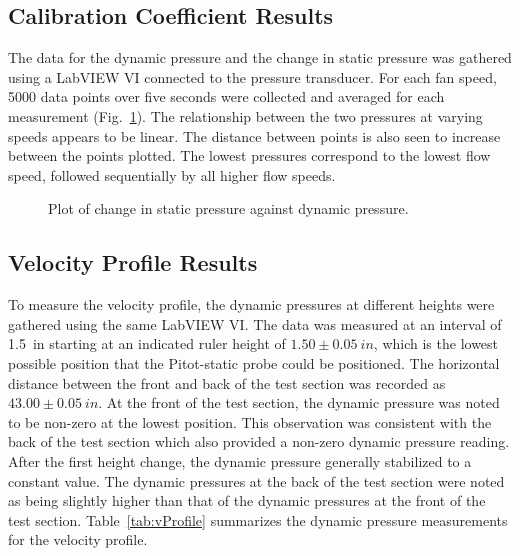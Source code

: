 \documentclass[journal,letterpaper]{IEEEtran}
\begin{document}
\subsection{Calibration Coefficient Results}

The data for the dynamic pressure and the change in static pressure was gathered using a LabVIEW VI connected to the pressure transducer.
For each fan speed, 5000 data points over five seconds were collected and averaged for each measurement (Fig.~\ref{fig:data}).
The relationship between the two pressures at varying speeds appears to be linear.
The distance between points is also seen to increase between the points plotted.
The lowest pressures correspond to the lowest flow speed, followed sequentially by all higher flow speeds.

\begin{figure}[H]
    \centering
    
    \caption{Plot of change in static pressure against dynamic pressure.}
    \label{fig:data}
\end{figure}

\subsection{Velocity Profile Results}

To measure the velocity profile, the dynamic pressures at different heights were gathered using the same LabVIEW VI.
The data was measured at an interval of \qty{1.5}{in} starting at an indicated ruler height of $1.50 \pm \qty{0.05}{in}$, which is the lowest possible position that the Pitot-static probe could be positioned.
The horizontal distance between the front and back of the test section was recorded as $43.00 \pm \qty{0.05}{in}$.
At the front of the test section, the dynamic pressure was noted to be non-zero at the lowest position.
This observation was consistent with the back of the test section which also provided a non-zero dynamic pressure reading.
After the first height change, the dynamic pressure generally stabilized to a constant value.
The dynamic pressures at the back of the test section were noted as being slightly higher than that of the dynamic pressures at the front of the test section. Table~\ref{tab:vProfile} summarizes the dynamic pressure measurements for the velocity profile.
\end{document}
